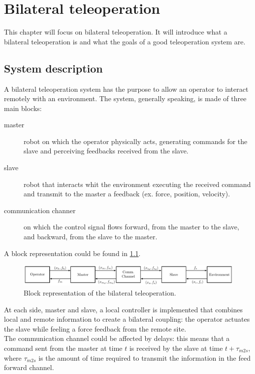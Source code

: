 \chapter{Bilateral teleoperation} 
This chapter will focus on bilateral teleoperation.
It will introduce what a bilateral teleoperation is and what the goals of a good teleoperation system are.

 \section{System description}
A bilateral teleoperation system has the purpose to allow an operator to interact remotely with an environment. The system, generally speaking, is made of three main blocks: 
\begin{description}
	\item[master] robot on which the operator physically acts, generating commands for the slave and perceiving feedbacks received from the slave. 
	\item[slave] robot that interacts whit the environment executing the received command and transmit to the master a feedback (ex. force, position, velocity).
	\item[communication channer] on which the control signal flows forward, from the master to the slave, and backward, from the slave to the master.
\end{description}
A block representation could be found in \figurename{\ref{sch:bilateral_teleop}}.\\
\begin{figure}
	\includegraphics[width=\textwidth]{schemas/Bilateral_Teleop.pdf}
	\caption[Block representation of the bilateral teleoperation]{Block representation of the bilateral teleoperation.}
	\label{sch:bilateral_teleop}
\end{figure}
At each side, master and slave, a local controller is implemented that combines local and remote information to create a bilateral coupling: the operator actuates the slave while feeling a force feedback from the remote site.\\
The communication channel could be affected by delays: this means that a command sent from the master at time $t$ is received by the slave at time $t + \tau_{m2s}$, where $\tau_{m2s}$ is the amount of time required to transmit the information in the feed forward channel.\\
